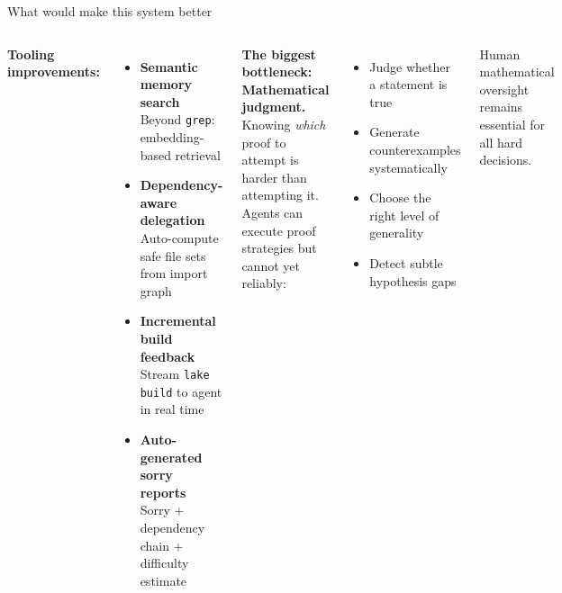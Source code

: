 \documentclass[aspectratio=169,10pt]{beamer}
\begin{document}
\begin{frame}{What would make this system better}
    \begin{columns}[T]
        \textcolor{leangreen}{\textbf{Tooling improvements:}}
        \begin{itemize}
            \item \textbf{Semantic memory search}\\{\scriptsize Beyond \texttt{grep}: embedding-based retrieval}
            \item \textbf{Dependency-aware delegation}\\{\scriptsize Auto-compute safe file sets from import graph}
            \item \textbf{Incremental build feedback}\\{\scriptsize Stream \texttt{lake build} to agent in real time}
            \item \textbf{Auto-generated sorry reports}\\{\scriptsize Sorry + dependency chain + difficulty estimate}
        \end{itemize}
        \textcolor{amber}{\textbf{The biggest bottleneck:}}\\[4pt]
        \textbf{Mathematical judgment.}\\[3pt]
        Knowing \emph{which} proof to attempt is harder than attempting it. Agents can execute proof strategies but cannot yet reliably:
        \begin{itemize}
            \item Judge whether a statement is true
            \item Generate counterexamples systematically
            \item Choose the right level of generality
            \item Detect subtle hypothesis gaps
        \end{itemize}
        \vspace{0.3em}
        \textcolor{dimwhite}{\scriptsize Human mathematical oversight remains essential for all hard decisions.}
    \end{columns}
\end{frame}
\end{document}
